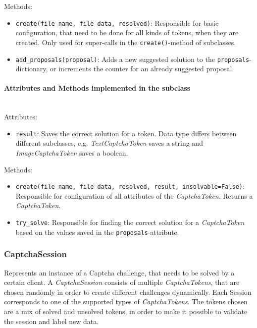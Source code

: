 Methods:

\begin{itemize}
\item \verb|create(file_name, file_data, resolved)|: Responsible for basic configuration, that need to be done for all kinds of tokens, when they are created. Only used for super-calls in the \verb|create()|-method of subclasses.
\item \verb|add_proposals(proposal)|: Adds a new suggested solution to the \verb|proposals|-dictionary, or increments the counter for an already suggested proposal.
\end{itemize}

\paragraph{Attributes and Methods implemented in the subclass} \mbox{} \\
Attributes: 

\begin{itemize}
\item \verb|result|: Saves the correct solution for a token. Data type differs between different subclasses, e.g. \emph{TextCaptchaToken} saves a string and \emph{ImageCaptchaToken} saves a boolean.
\end{itemize}

Methods:

\begin{itemize}
\item \verb|create(file_name, file_data, resolved, result, insolvable=False)|: Responsible for configuration of all attributes of the \emph{CaptchaToken}. Returns a \emph{CaptchaToken}.
\item \verb|try_solve|: Responsible for finding the correct solution for a \emph{CaptchaToken} based on the values saved in the \verb|proposals|-attribute.
\end{itemize}

\clearpage
\subsubsection{CaptchaSession}

Represents an instance of a Captcha challenge, that needs to be solved by a certain client. A \emph{CaptchaSession} consists of multiple \emph{CaptchaTokens}, that are chosen randomly in order to create different challenges dynamically. Each Session corresponds to one of the supported types of \emph{CaptchaTokens}. The tokens chosen are a mix of solved and unsolved tokens, in order to make it possible to validate the session and label new data.

